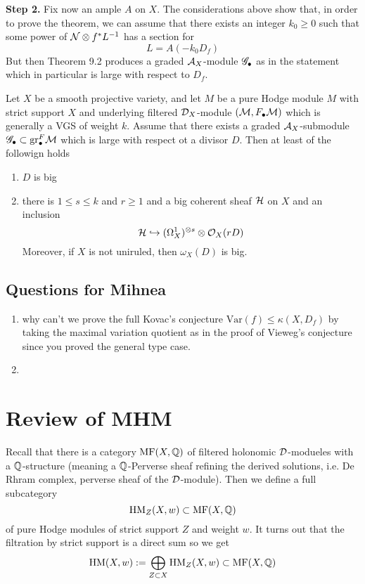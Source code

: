 \documentclass[12pt]{article}
\renewcommand{\gr}{\mathrm{gr}}
\begin{document}
\textbf{Step 2.} Fix now an ample $A$ on $X$. The considerations above show that, in order to prove the theorem, we can assume that there exists an integer $k_0 \ge 0$ such that some power of $\mathcal{N} \otimes f^* L^{-1}$ has a section for 
\[ L = A(-k_0 D_f) \]
But then Theorem 9.2 produces a graded $\mathcal{A}_X$-module $\mathscr{G}_\bullet$ as in the statement which in particular is large with respect to $D_f$.

\begin{theorem}
Let $X$ be a smooth projective variety, and let $M$ be a pure Hodge module $M$ with strict support $X$ and underlying filtered $\mathcal{D}_X$-module $(\mathcal{M}, F_\bullet \mathcal{M})$ which is generally a VGS of weight $k$. Assume that there exists a graded $\mathcal{A}_X$-submodule $\G_\bullet \subset \gr_\bullet^F \cM$ which is large with respect ot a divisor $D$. Then at least of the followign holds
\begin{enumerate}
\item $D$ is big
\item there is $1 \le s \le k$ and $r \ge 1$ and a big coherent sheaf $\mathcal{H}$ on $X$ and an inclusion
\[ \mathcal{H} \hookrightarrow (\Omega_X^1)^{\otimes s} \otimes \mathcal{O}_{X}(r D) \]
Moreover, if $X$ is not uniruled, then $\omega_X(D)$ is big. 
\end{enumerate}
\end{theorem}

\subsection{Questions for Mihnea}

\begin{enumerate}
\item why can't we prove the full Kovac's conjecture $\mathrm{Var}(f) \le \kappa(X,D_f)$ by taking the maximal variation quotient as in the proof of Vieweg's conjecture since you proved the general type case. 

\item 
\end{enumerate}


\section{Review of MHM}

\newcommand{\MF}{\mathrm{MF}}
\newcommand{\DD}{\mathbb{D}}
\newcommand{\MHM}{\mathrm{MHM}}

Recall that there is a category $\MF(X, \Q)$ of filtered holonomic $\mathcal{D}$-modueles with a $\mathbb{Q}$-structure (meaning a $\mathbb{Q}$-Perverse sheaf refining the derived solutions, i.e. De Rhram complex, perverse sheaf of the $\mathcal{D}$-module). Then we define a full subcategory 
\[ \HM_Z(X, w) \subset \MF(X, \Q) \]
of pure Hodge modules of strict support $Z$ and weight $w$. It turns out that the filtration by strict support is a direct sum so we get
\[ \HM(X, w) := \bigoplus_{Z \subset X} \HM_Z(X, w) \subset \MF(X, \Q) \]
\end{document}
